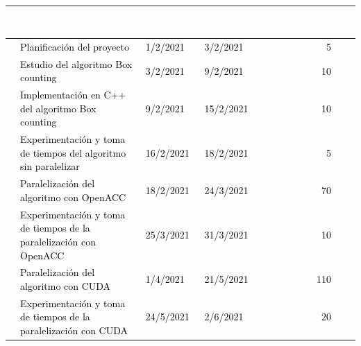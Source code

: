 \begin{table}[H]
    \centering
    \begin{adjustbox}{angle=90, max height=\textheight}
    \begin{tabular}{|clllrrl|} 
    \hline
    \rowcolor{black} \multicolumn{1}{|l}{}  & \textcolor{white}{Tareas} & \textcolor{white}{Fecha de inicio}         & \textcolor{white}{Fecha de finalización} & \textcolor{white}{Horas estimadas}&\\                                      
    \hline
    \rowcolor{white} \multicolumn{1}{|l}{}  & \textcolor{black}{Planificación del proyecto} & \textcolor{black}{1/2/2021}         & \textcolor{black}{3/2/2021} & \textcolor{black}{5}&\\
    \hline
    \rowcolor{white} \multicolumn{1}{|l}{}  & \textcolor{black}{Estudio del algoritmo Box counting} & \textcolor{black}{3/2/2021}         & \textcolor{black}{9/2/2021} & \textcolor{black}{10}&\\  
    \hline
    \rowcolor{white} \multicolumn{1}{|l}{}  & \textcolor{black}{Implementación en C++ del algoritmo Box counting} & \textcolor{black}{9/2/2021}         & \textcolor{black}{15/2/2021} & \textcolor{black}{10}\\
    \hline
    \rowcolor{white} \multicolumn{1}{|l}{}  & \textcolor{black}{Experimentación y toma de tiempos del algoritmo sin paralelizar} & \textcolor{black}{16/2/2021}         & \textcolor{black}{18/2/2021} &\textcolor{black}{5}&\\
    \hline
    \rowcolor{white} \multicolumn{1}{|l}{}  & \textcolor{black}{Paralelización del algoritmo con OpenACC} & \textcolor{black}{18/2/2021}         & \textcolor{black}{24/3/2021} &\textcolor{black}{70}\\
    \hline
    \rowcolor{white} \multicolumn{1}{|l}{}  & \textcolor{black}{Experimentación y toma de tiempos de la paralelización con OpenACC} & \textcolor{black}{25/3/2021}         & \textcolor{black}{31/3/2021} &\textcolor{black}{10}\\
    \hline
    \rowcolor{white} \multicolumn{1}{|l}{}  & \textcolor{black}{Paralelización del algoritmo con CUDA} & \textcolor{black}{1/4/2021}         & \textcolor{black}{21/5/2021} &\textcolor{black}{110}\\
    \hline
    \rowcolor{white} \multicolumn{1}{|l}{}  & \textcolor{black}{Experimentación y toma de tiempos de la paralelización con CUDA} & \textcolor{black}{24/5/2021}         & \textcolor{black}{2/6/2021} &\textcolor{black}{20}\\

\end{tabular}
\end{adjustbox}
\end{table}
